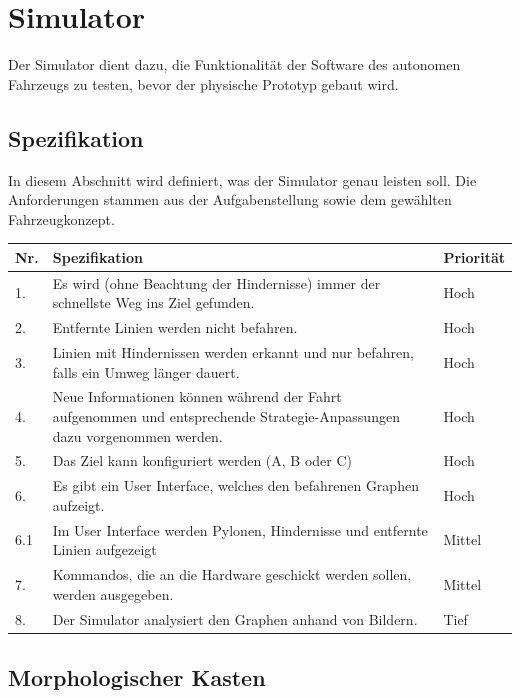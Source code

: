 \documentclass[../main.tex]{subfiles}
\begin{document}
\newpage
\section{Simulator}

Der Simulator dient dazu, die Funktionalität der Software des autonomen Fahrzeugs zu testen, bevor der physische Prototyp gebaut wird. 

\subsection{Spezifikation}

In diesem Abschnitt wird definiert, was der Simulator genau leisten soll. Die Anforderungen stammen aus der Aufgabenstellung sowie dem gewählten Fahrzeugkonzept.

\begin{table}[htbp!]
    \centering
    \begin{tabularx}{\textwidth}{| l | X | l |}
        \hline
        \textbf{Nr.} & \textbf{Spezifikation} & \textbf{Priorität} \\ \hline
        1. & Es wird (ohne Beachtung der Hindernisse) immer der schnellste Weg ins Ziel gefunden. & Hoch \\ \hline
        2. & Entfernte Linien werden nicht befahren. & Hoch \\ \hline
        3. & Linien mit Hindernissen werden erkannt und nur befahren, falls ein Umweg länger dauert. & Hoch \\ \hline
        4. & Neue Informationen können während der Fahrt aufgenommen und entsprechende Strategie-Anpassungen dazu vorgenommen werden. & Hoch \\ \hline
        5. & Das Ziel kann konfiguriert werden (A, B oder C) & Hoch \\ \hline
        6. & Es gibt ein User Interface, welches den befahrenen Graphen aufzeigt. & Hoch \\ \hline
        6.1 & Im User Interface werden Pylonen, Hindernisse und entfernte Linien aufgezeigt & Mittel \\ \hline
        7. & Kommandos, die an die Hardware geschickt werden sollen, werden ausgegeben. & Mittel \\ \hline
        8. & Der Simulator analysiert den Graphen anhand von Bildern. & Tief \\ \hline
    \end{tabularx}
\end{table}

\newpage
\subsection{Morphologischer Kasten}
\end{document}
